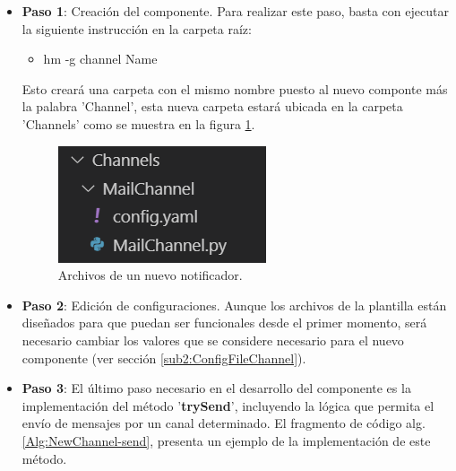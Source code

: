         \begin{itemize}
            \item \textbf{Paso 1}: Creación del componente. Para realizar este paso, basta con ejecutar la siguiente instrucción en la carpeta raíz:
            \begin{itemize}
                \item hm -g channel Name
            \end{itemize}
            Esto creará una carpeta con el mismo nombre puesto al nuevo componte más la palabra 'Channel', esta nueva carpeta estará ubicada en la carpeta 'Channels' como se muestra en la figura \ref{fig:NewChannel}.
    
            \begin{figure}[ht!]
            	\centering
            	\includegraphics[width=0.4\linewidth]{imgs/03-Architecture/03-NewChannel.png}
            	\caption[Archivos de un nuevo notificador]{Archivos de un nuevo notificador.}
        	    \label{fig:NewChannel}
            \end{figure}%
            
            \item \textbf{Paso 2}: Edición de configuraciones. Aunque los archivos de la plantilla están diseñados para que puedan ser funcionales desde el primer momento, será necesario cambiar los valores que se considere necesario para el nuevo componente (ver sección \ref{sub2:ConfigFileChannel}).
            
            \item \textbf{Paso 3}: El último paso necesario en el desarrollo del componente es la implementación del método '\textbf{trySend}', incluyendo la lógica que permita el envío de mensajes por un canal determinado. El fragmento de código alg. \ref{Alg:NewChannel-send}, presenta un ejemplo de la implementación de este método.

            
            
        \end{itemize}
        
